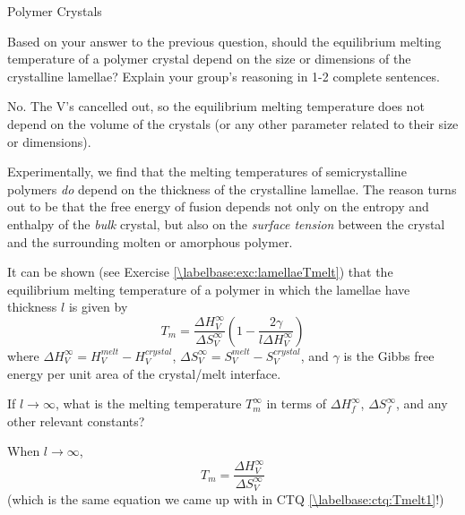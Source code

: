 \begin{activity}{Polymer Crystals}
\begin{ctqs}
	\question Based on your answer to the previous question, should the equilibrium melting temperature of a polymer crystal depend on the size or dimensions of the crystalline lamellae?  Explain your group's reasoning in 1-2 complete sentences.
	
		\begin{solution}[1in]{}
			No.  The V's cancelled out, so the equilibrium melting temperature does not depend on the volume of the crystals (or any other parameter related to their size or dimensions).
		\end{solution}
	
\end{ctqs}

\begin{infobox}
	Experimentally, we find that the melting temperatures of semicrystalline polymers \emph{do} depend on the thickness of the crystalline lamellae.  
	The reason turns out to be that the free energy of fusion depends not only on the entropy and enthalpy of the \textit{bulk} crystal, but also on the \textit{surface tension} between the crystal and the surrounding molten or amorphous polymer.
	
	It can be shown (see Exercise \ref{\labelbase:exc:lamellaeTmelt}) that the equilibrium melting temperature of a polymer in which the lamellae have thickness $l$ is given by \label{\labelbase:info:lamellaeTmelt}
		\begin{equation*}
			T_m = \frac{\Delta H^\infty_V}{\Delta S^\infty_V}\left(1-\frac{2\gamma}{l \Delta H^\infty_V}\right)
		\end{equation*}
		where $\Delta H^\infty_V = H^{melt}_V - H^{crystal}_V$, $\Delta S^\infty_V = S^{melt}_V - S^{crystal}_V$,
		and $\gamma$ is the Gibbs free energy per unit area of the crystal/melt interface.
		
\end{infobox}
	
\begin{ctqs}	
	
	\question If $l\to\infty$, what is the melting temperature $T_m^\infty$ in terms of $\Delta H_f^\infty$, $\Delta S_f^\infty$, and any other relevant constants?
	
		\begin{solution}[1in]{}
			When $l\to\infty$,
			\begin{equation*}
				T_m = \frac{\Delta H_V^\infty}{\Delta S_V^\infty}
			\end{equation*}
			(which is the same equation we came up with in CTQ \ref{\labelbase:ctq:Tmelt1}!)
		\end{solution}
			

\end{ctqs}
\end{activity}
